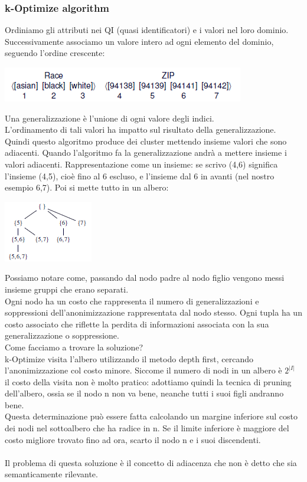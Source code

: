 \subsubsection{k-Optimize algorithm}
Ordiniamo gli attributi nei QI (quasi identificatori) e i valori nel loro dominio. Successivamente associamo un valore intero ad ogni elemento del dominio, seguendo l'ordine crescente:
\begin{center}
    \includegraphics[scale=0.6]{img/koptim.png}
\end{center}
Una generalizzazione è l'unione di ogni valore degli indici.\\
L'ordinamento di tali valori ha impatto sul risultato della generalizzazione.\\
Quindi questo algoritmo produce dei cluster mettendo insieme valori che sono adiacenti. Quando l’algoritmo fa la generalizzazione andrà a mettere insieme i valori adiacenti. Rappresentazione come un insieme: se scrivo (4,6) significa l’insieme (4,5), cioè fino al 6 escluso, e l’insieme dal 6 in avanti (nel nostro esempio 6,7). Poi si mette tutto in un albero:
\begin{center}
    \includegraphics[scale=0.6]{img/koptimtree.png}
\end{center}
Possiamo notare come, passando dal nodo padre al nodo figlio vengono messi insieme gruppi che erano separati.\\
Ogni nodo ha un costo che rappresenta il numero di generalizzazioni e soppressioni dell'anonimizzazione rappresentata dal nodo stesso. Ogni tupla ha un costo associato che riflette la perdita di informazioni associata con la sua generalizzazione o soppressione.\\
Come facciamo a trovare la soluzione?\\
k-Optimize visita l'albero utilizzando il metodo depth first, cercando l'anonimizzazione col costo minore. Siccome il numero di nodi in un albero è \(2^{|I|}\) il costo della visita non è molto pratico: adottiamo quindi la tecnica di pruning dell'albero, ossia se il nodo n non va bene, neanche tutti i suoi figli andranno bene.\\
Questa determinazione può essere fatta calcolando un margine inferiore sul costo dei nodi nel sottoalbero che ha radice in n. Se il limite inferiore è maggiore del costo migliore trovato fino ad ora, scarto il nodo n e i suoi discendenti.\\\\
Il problema di questa soluzione è il concetto di adiacenza che non è detto che sia semanticamente rilevante.

